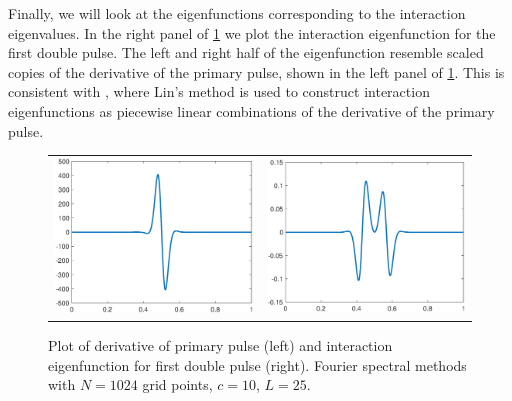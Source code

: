 \documentclass[thesis2.tex]{subfiles}
\begin{document}
Finally, we will look at the eigenfunctions corresponding to the interaction eigenvalues. In the right panel of \cref{fig:KdV5inteigplot} we plot the interaction eigenfunction for the first double pulse. The left and right half of the eigenfunction resemble scaled copies of the derivative of the primary pulse, shown in the left panel of \cref{fig:KdV5inteigplot}. This is consistent with \cite{Sandstede1998}, where Lin's method is used to construct interaction eigenfunctions as piecewise linear combinations of the derivative of the primary pulse.

\begin{figure}
\begin{center}
\begin{tabular}{cc}
\includegraphics[width=6cm]{images/kdv5numerics/single10derivative} &
\includegraphics[width=6cm]{images/kdv5numerics/double1inteigfunction} \\
\end{tabular}
\caption[Interaction eigenfunctions for double pulses in KdV5]{Plot of derivative of primary pulse (left) and interaction eigenfunction for first double pulse (right). Fourier spectral methods with $N = 1024$ grid points, $c = 10$, $L = 25$.}
\label{fig:KdV5inteigplot}
\end{center}
\end{figure}
\end{document}
